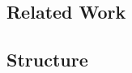 \documentclass[../MasterThesis.tex]{subfiles}
\begin{document}
	
	
	
	
	
	
	
	
	
	
	
	\subsection{Related Work} \label{subsection:relatedwork}
	
	
	
	
	
	
	
	
	
	
	\subsection{Structure} \label{subsection:structure}
	
	
	
	
	
	

	
	

	
	
	
\end{document}
